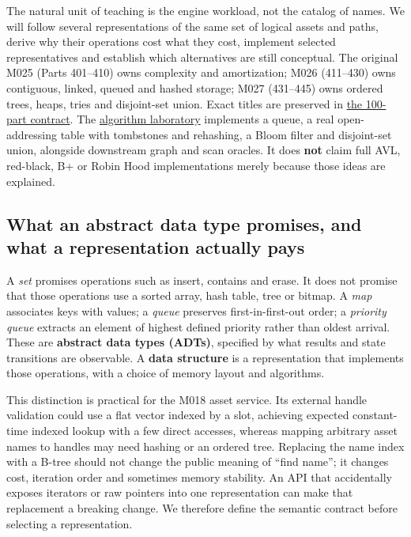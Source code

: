 The natural unit of teaching is the engine workload, not the catalog of names. We will follow several representations of the same set of logical assets and paths, derive why their operations cost what they cost, implement selected representatives and establish which alternatives are still conceptual. The original M025 (Parts 401--410) owns complexity and amortization; M026 (411--430) owns contiguous, linked, queued and hashed storage; M027 (431--445) owns ordered trees, heaps, tries and disjoint-set union. Exact titles are preserved in \hyperref[appendix-fd090d982a15-phase-5-algorithms-and-data-structure-workload-contracts-parts-401500]{the 100-part contract}. The \hyperref[source-file-0ec69e1a1a11439bca29faa5]{algorithm laboratory} implements a queue, a real open-addressing table with tombstones and rehashing, a Bloom filter and disjoint-set union, alongside downstream graph and scan oracles. It does \textbf{not} claim full AVL, red-black, B+ or Robin Hood implementations merely because those ideas are explained.

\subsection{What an abstract data type promises, and what a representation actually pays}\label{01-foundations-i-ch007-what-an-abstract-data-type-promises-and-what-a-representation-actually-pays}

A \emph{set} promises operations such as insert, contains and erase. It does not promise that those operations use a sorted array, hash table, tree or bitmap. A \emph{map} associates keys with values; a \emph{queue} preserves first-in-first-out order; a \emph{priority queue} extracts an element of highest defined priority rather than oldest arrival. These are \textbf{abstract data types (ADTs)}, specified by what results and state transitions are observable. A \textbf{data structure} is a representation that implements those operations, with a choice of memory layout and algorithms.

This distinction is practical for the M018 asset service. Its external handle validation could use a flat vector indexed by a slot, achieving expected constant-time indexed lookup with a few direct accesses, whereas mapping arbitrary asset names to handles may need hashing or an ordered tree. Replacing the name index with a B-tree should not change the public meaning of ``find name''; it changes cost, iteration order and sometimes memory stability. An API that accidentally exposes iterators or raw pointers into one representation can make that replacement a breaking change. We therefore define the semantic contract before selecting a representation.

